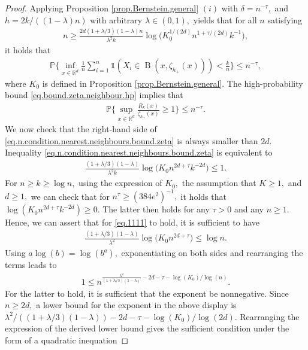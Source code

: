 \documentclass[10pt]{article}
\newcommand{\PP}{\mathbb{P}}
\newcommand{\RR}{\mathbb{R}}
\newcommand{\B}{\operatorname{B}}
\begin{document}
\begin{proof}
    Applying Proposition \ref{prop.Bernstein.general} $(i)$ with $\delta = n^{-\tau},$ and $h = 2k/((1 - \lambda)n)$ with arbitrary $\lambda \in (0, 1),$ yields that for all $n$ satisfying
    \begin{align}
        \label{eq.n.condition.nearest.neighbours.bound.zeta}
        n \geq \frac{2d(1 + \lambda/3)(1 - \lambda)n}{\lambda^2k}\log\Big(K_0^{1/(2d)}n^{1 + \tau/(2d)}k^{-1}\Big),
    \end{align}
    it holds that
    \begin{align}
        \label{eq.bound.zeta.neighbour.hp}
        \PP\Bigg\{\inf_{x \in \RR^d}\frac{1}{n}\sum_{i=1}^n \mathds{1}(X_i \in \B(x, \zeta_{h_+}(x))) <\frac kn\Bigg\} \leq n^{-\tau},
    \end{align}
    where $K_0$ is defined in Proposition \ref{prop.Bernstein.general}. The high-probability bound \eqref{eq.bound.zeta.neighbour.hp} implies that
    \begin{align*}
        \PP\Bigg\{\sup_{x \in \RR^d}\frac{R_k(x)}{\zeta_{h_+}(x)} \geq 1\Bigg\} \leq n^{-\tau}.
    \end{align*}
    We now check that the right-hand side of \eqref{eq.n.condition.nearest.neighbours.bound.zeta} is always smaller than $2d$. Inequality \eqref{eq.n.condition.nearest.neighbours.bound.zeta} is equivalent to
    \begin{align}
        \label{eq.1111}
        \frac{(1 + \lambda/3)(1-\lambda)}{\lambda^2k}\log\Big(K_0n^{2d + \tau}k^{-2d}\Big) \leq 1.
    \end{align}
    For $n \geq k \geq \log n,$ using the expression of $K_0,$ the assumption that $K \geq 1,$ and $d\geq 1,$ we can check that for $n^\tau \geq (384e^2)^{-1},$ it holds that $\log(K_0n^{2d + \tau}k^{-2d})\geq 0.$ The latter then holds for any $\tau > 0$ and any $n \geq 1.$ Hence, we can assert that for \eqref{eq.1111} to hold, it is sufficient to have
    \begin{align*}
        \frac{(1 + \lambda /3)(1 - \lambda)}{\lambda^2}\log\Big(K_0n^{2d + \tau}\Big) \leq \log n.
    \end{align*}
    Using $a\log(b) = \log(b^a),$ exponentiating on both sides and rearranging the terms leads to 
    \begin{align*}
        1 \leq n^{\tfrac{\lambda^2}{(1 + \lambda/3)(1 - \lambda)} - 2d - \tau - \log(K_0)/\log(n)}.
    \end{align*}
    For the latter to hold, it is sufficient that the exponent be nonnegative. Since $n \geq 2d,$ a lower bound for the exponent in the above display is $\lambda^2/((1 + \lambda/3)(1 - \lambda)) - 2d - \tau - \log(K_0)/\log(2d).$ Rearranging the expression of the derived lower bound gives the sufficient condition under the form of a quadratic inequation

\end{proof}
\end{document}
